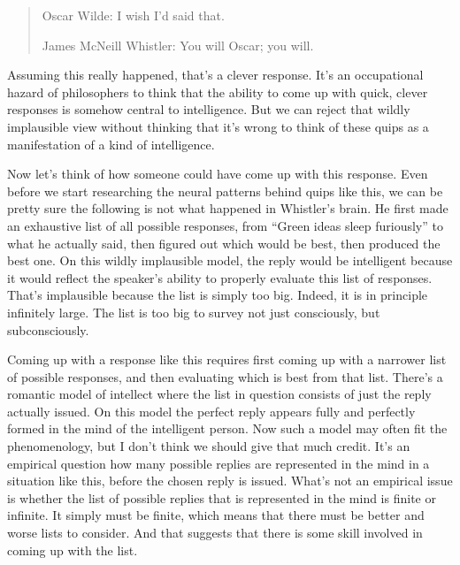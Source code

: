 \documentclass[
  11pt,
  letterpaper,
  DIV=11,
  numbers=noendperiod,
  oneside]{scrartcl}
\begin{document}
\begin{quote}
Oscar Wilde: I wish I'd said that.

James McNeill Whistler: You will Oscar; you will.
\end{quote}

Assuming this really happened, that's a clever response. It's an
occupational hazard of philosophers to think that the ability to come up
with quick, clever responses is somehow central to intelligence. But we
can reject that wildly implausible view without thinking that it's wrong
to think of these quips as a manifestation of a kind of intelligence.

Now let's think of how someone could have come up with this response.
Even before we start researching the neural patterns behind quips like
this, we can be pretty sure the following is not what happened in
Whistler's brain. He first made an exhaustive list of all possible
responses, from ``Green ideas sleep furiously'' to what he actually
said, then figured out which would be best, then produced the best one.
On this wildly implausible model, the reply would be intelligent because
it would reflect the speaker's ability to properly evaluate this list of
responses. That's implausible because the list is simply too big.
Indeed, it is in principle infinitely large. The list is too big to
survey not just consciously, but subconsciously.

Coming up with a response like this requires first coming up with a
narrower list of possible responses, and then evaluating which is best
from that list. There's a romantic model of
intellect where the list in question consists of just the reply actually
issued. On this model the perfect reply appears fully and perfectly
formed in the mind of the intelligent person. Now such a model may often
fit the phenomenology, but I don't think we should give that much
credit. It's an empirical question how many possible replies are
represented in the mind in a situation like this, before the chosen
reply is issued. What's not an empirical issue is whether the list of
possible replies that is represented in the mind is finite or infinite.
It simply must be finite, which means that there must be better and
worse lists to consider. And that suggests that there is some skill
involved in coming up with the list.
\end{document}
